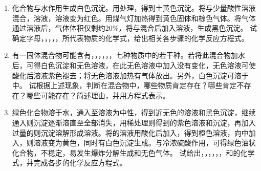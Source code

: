 \begin{enumerate}[label=\arabic*., start=1, itemsep=1.5ex]
    \item 化合物与水作用生成白色沉淀。用处理，得到土黄色沉淀。将与少量酸性溶液混合，溶液，溶液变为红色。用煤气灯加热得到黄色固体和棕色气体。将气体通过溶液后，气体体积仅剩约20\%，将与混合后加入溶液，生成黑色沉淀。
    试确定字母，，，，，所代表物质的化学式，给出相关各步骤的化学反应方程式。
    \item 有一固体混合物可能含有，，，，，，七种物质中的若干种。若将此混合物加水后，可得白色沉淀和无色溶液，在此无色溶液中加入没有变化，无色溶液可使酸化后溶液紫色褪去；将无色溶液加热有气体放出。另外，白色沉淀可溶于中。
    试根据上述现象，判断在混合物中，哪些物质肯定存在？哪些肯定不存在？哪些可能存在？简述理由，并用方程式表示。
    \item 绿色化合物溶于水，通入至溶液为中性，得到近无色的溶液和黑色沉淀，继续通入则沉淀逐渐溶直至全部消失，用稀处理则得到的紫色溶液和沉淀，再加入过量的则沉淀溶解形成溶液。将的溶液用酸化后加入，得到橙色溶液，向中加入，则溶液变为黄色，同时有白色沉淀生成。与冷浓硫酸作用，可得绿色油状化合物，不稳定，易发生爆炸分解生成和无色气体。
    试给出，，，，，，和的化学式，并完成各步的化学反应方程式。
\end{enumerate}